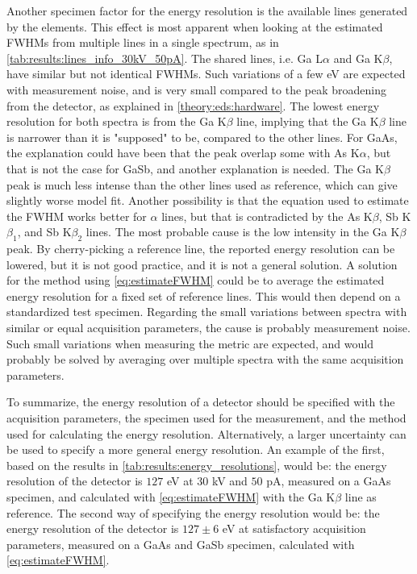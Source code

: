 Another specimen factor for the energy resolution is the available lines generated by the elements.
This effect is most apparent when looking at the estimated FWHMs from multiple lines in a single spectrum, as in \cref{tab:results:lines_info_30kV_50pA}.
The shared lines, i.e. Ga L$\alpha$ and Ga K$\beta$, have similar but not identical FWHMs.
Such variations of a few eV are expected with measurement noise, and is very small compared to the peak broadening from the detector, as explained in \cref{theory:eds:hardware}.
The lowest energy resolution for both spectra is from the Ga K$\beta$ line, implying that the Ga K$\beta$ line is narrower than it is "supposed" to be, compared to the other lines.
For GaAs, the explanation could have been that the peak overlap some with As K$\alpha$, but that is not the case for GaSb, and another explanation is needed.
The Ga K$\beta$ peak is much less intense than the other lines used as reference, which can give slightly worse model fit.
Another possibility is that the equation used to estimate the FWHM works better for $\alpha$ lines, but that is contradicted by the As K$\beta$, Sb K$\beta_1$, and Sb K$\beta_2$ lines.
The most probable cause is the low intensity in the Ga K$\beta$ peak.
By cherry-picking a reference line, the reported energy resolution can be lowered, but it is not good practice, and it is not a general solution.
A solution for the method using \cref{eq:estimateFWHM} could be to average the estimated energy resolution for a fixed set of reference lines.
This would then depend on a standardized test specimen.
Regarding the small variations between spectra with similar or equal acquisition parameters, the cause is probably measurement noise.
Such small variations when measuring the metric are expected, and would probably be solved by averaging over multiple spectra with the same acquisition parameters.


To summarize, the energy resolution of a detector should be specified with the acquisition parameters, the specimen used for the measurement, and the method used for calculating the energy resolution.
Alternatively, a larger uncertainty can be used to specify a more general energy resolution.
An example of the first, based on the results in \cref{tab:results:energy_resolutions}, would be:  the energy resolution of the detector is $127$ eV at $30$ kV and $50$ pA, measured on a GaAs specimen, and calculated with \cref{eq:estimateFWHM} with the Ga K$\beta$ line as reference.
The second way of specifying the energy resolution would be: the energy resolution of the detector is $127 \pm 6$ eV at satisfactory acquisition parameters, measured on a GaAs and GaSb specimen, calculated with \cref{eq:estimateFWHM}.



